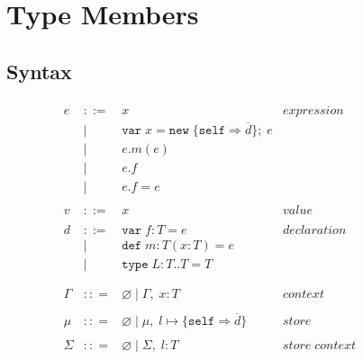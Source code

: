 \documentclass{llncs}
\begin{document}
\section{Type Members}

\subsection{Syntax}



\[
\begin{array}{lll}
\begin{array}{lllr}
e & ::= & x & expression \\
& | & \texttt{var} \; x = \texttt{new} \; \{\texttt{self} \Rightarrow \overline{d}\}; \; e&\\
& | & e.m(e) &\\
& | & e.f &\\
& | & e.f = e&\\
&&\\
v & ::= & x & value \\
&&\\
d & ::= & \texttt{var} \; f : T = e & declaration \\
  & |   & \texttt{def} \; m : T(x:T) = e &\\
  & |   & \texttt{type} \; L : T .. T = T &\\
&&\\
&&\\
\Gamma & :: = & \varnothing \; | \; \Gamma, \; x : T & context \\
&&\\
\mu & :: = & \varnothing \; | \; \mu,\; l \mapsto \{\texttt{self} \Rightarrow \overline{d}\} & store \\
&&\\
\Sigma & :: = & \varnothing \; | \; \Sigma,\; l : T & store \; context \\
\end{array}
& ~~~~~~
&
\begin{array}{lllr}

\end{array}
\end{array}\]
\end{document}
